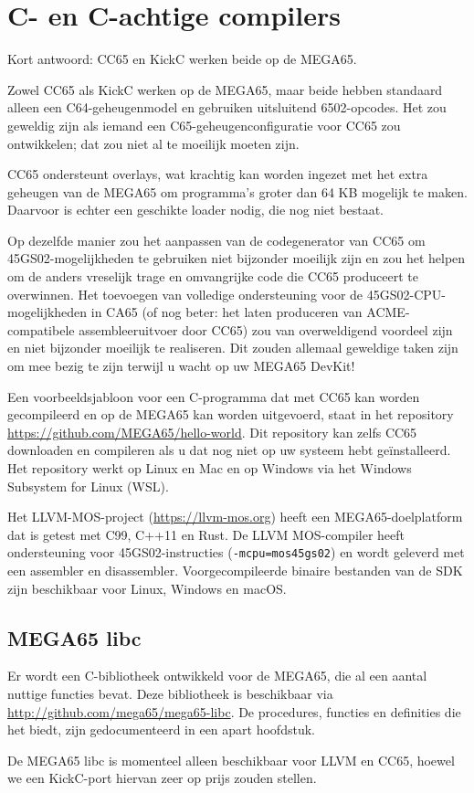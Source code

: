 \chapter{C- en C-achtige compilers}

Kort antwoord: CC65 en KickC werken beide op de MEGA65.

Zowel CC65 als KickC werken op de MEGA65, maar beide hebben standaard
alleen een C64-geheugenmodel en gebruiken uitsluitend 6502-opcodes.
Het zou geweldig zijn als iemand een C65-geheugenconfiguratie voor
CC65 zou ontwikkelen; dat zou niet al te moeilijk moeten zijn.

CC65 ondersteunt overlays, wat krachtig kan worden ingezet met het
extra geheugen van de MEGA65 om programma's groter dan 64 KB mogelijk
te maken. Daarvoor is echter een geschikte loader nodig, die nog niet
bestaat.

Op dezelfde manier zou het aanpassen van de codegenerator van CC65 om
45GS02-mogelijkheden te gebruiken niet bijzonder moeilijk zijn en zou
het helpen om de anders vreselijk trage en omvangrijke code die CC65
produceert te overwinnen. Het toevoegen van volledige ondersteuning
voor de 45GS02-CPU-mogelijkheden in CA65 (of nog beter: het laten
produceren van ACME-compatibele assembleeruitvoer door CC65) zou van
overweldigend voordeel zijn en niet bijzonder moeilijk te realiseren.
Dit zouden allemaal geweldige taken zijn om mee bezig te zijn terwijl
u wacht op uw MEGA65 DevKit!

Een voorbeeldsjabloon voor een C-programma dat met CC65 kan worden
gecompileerd en op de MEGA65 kan worden uitgevoerd, staat in het
repository \url{https://github.com/MEGA65/hello-world}. Dit repository
kan zelfs CC65 downloaden en compileren als u dat nog niet op uw
systeem hebt geïnstalleerd. Het repository werkt op Linux en Mac en op Windows via het Windows Subsystem for Linux (WSL).

Het LLVM-MOS-project (\url{https://llvm-mos.org}) heeft een
MEGA65-doelplatform dat is getest met C99, C++11 en Rust. De LLVM
MOS-compiler heeft ondersteuning voor 45GS02-instructies
(\texttt{-mcpu=mos45gs02}) en wordt geleverd met een assembler en
disassembler. Voorgecompileerde binaire bestanden van de SDK zijn
beschikbaar voor Linux, Windows en macOS.

\section{MEGA65 libc}

Er wordt een C-bibliotheek ontwikkeld voor de MEGA65, die al een
aantal nuttige functies bevat. Deze bibliotheek is beschikbaar via
\url{http://github.com/mega65/mega65-libc}. De procedures, functies
en definities die het biedt, zijn gedocumenteerd in een apart
hoofdstuk.

De MEGA65 libc is momenteel alleen beschikbaar voor LLVM en CC65,
hoewel we een KickC-port hiervan zeer op prijs zouden stellen.
